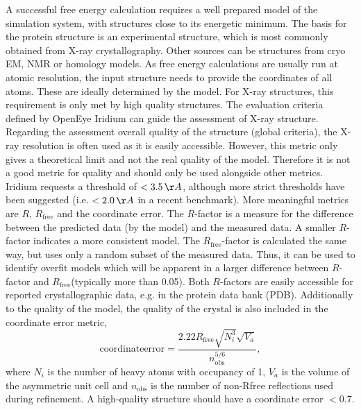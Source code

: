 \documentclass[9pt,bestpractices]{livecoms}
\begin{document}
A successful free energy calculation requires a well prepared model of the simulation system, with structures close to its energetic minimum. 
%
The basis for the protein structure is an experimental structure, which is most commonly obtained from X-ray crystallography.
Other sources can be structures from cryo EM, NMR or homology models.
As free energy calculations are usually run at atomic resolution, the input structure needs to provide the coordinates of all atoms. These are ideally determined by the model.
%
For X-ray structures, this requirement is only met by high quality structures.
The evaluation criteria defined by OpenEye Iridium\cite{warrenEssentialConsiderationsUsing2012} can guide the assessment of X-ray structure. 
%
Regarding the assessment overall quality of the structure (global criteria), the X-ray resolution is often used as it is easily accessible.
%
However, this metric only gives a theoretical limit and not the real quality of the model. Therefore it is not a good metric for quality and should only be used alongside other metrics. Iridium requests a threshold of $< 3.5\,\AA$,\cite{warrenEssentialConsiderationsUsing2012} although more strict thresholds have been suggested (i.e. $<2.0\,\AA$ in a recent benchmark\cite{schindlerLargeScaleAssessmentBinding2020}).
%
More meaningful metrics are $R$, $R_{\mathrm{free}}$ and the coordinate error. 
%
The $R$-factor is a measure for the difference between the predicted data (by the model) and the measured data. A smaller $R$-factor indicates a more consistent model. 
%
The $R_{\mathrm{free}}$-factor is calculated the same way, but uses only a random subset of the measured data. Thus, it can be used to identify overfit models which will be apparent in a larger difference between $R$-factor and $R_{\mathrm{free}}$(typically more than 0.05).
Both $R$-factors are easily accessible for reported crystallographic data, e.g. in the protein data bank (PDB).\cite{bermanProteinDataBank2000} 
%
Additionally to the quality of the model, the quality of the crystal is also included in the coordinate error metric,
%
\begin{equation}
    \mathrm{coordinate error} = \frac{2.22 R_{\mathrm{free}}\sqrt{N_i^3}\sqrt{V_a}} {n_{\mathrm{obs}}^{5/6}},
    \label{eq:coordinate_error}
\end{equation}
%
where $N_i$ is the number of heavy atoms with occupancy of 1, $V_a$ is the volume of the asymmetric unit cell and $n_{\mathrm{obs}}$ is the number of non-Rfree reflections used during refinement. A high-quality structure should have a coordinate error $<0.7$.
\end{document}
